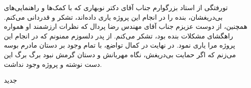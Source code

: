 


\begin{center}
\end{center}

‌تورفتگی از استاد بزرگوارم جناب آقای دکتر نوبهاری که با کمک‌ها و راهنمایی‌های بی‌دریغشان، بنده را در انجام این پروژه یاری داده‌اند، تشکر و قدردانی می‌کنم.
همچنین، از دوست عزیزم جناب آقای مهندس رضا پردال که نظرات ارزشمند او همواره راهگشای مشکلات بنده بود، تشکر می‌کنم.
از پدر دلسوزم ممنونم که در انجام این پروژه مرا یاری نمود. در نهایت در کمال تواضع، با تمام وجود بر دستان مادرم بوسه می‌زنم که اگر حمایت بی‌دریغش، نگاه مهربانش و دستان گرمش نبود برگ برگ این دست نوشته و پروژه وجود نداشت.

‌جدید
